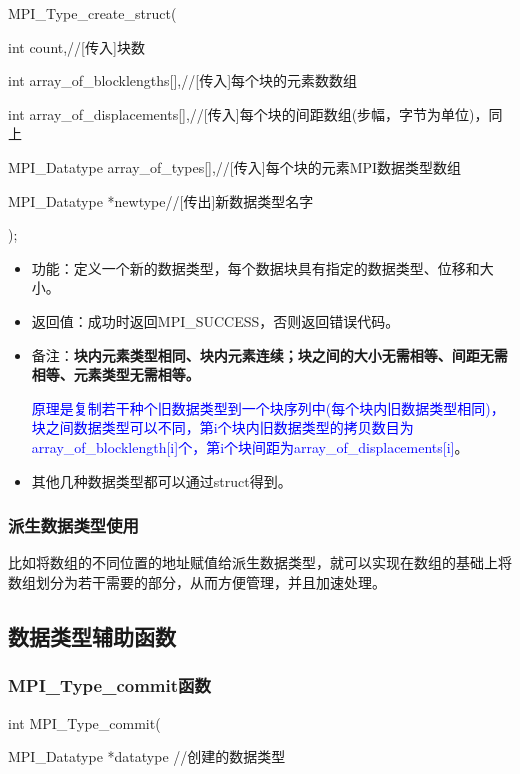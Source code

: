 \documentclass[UTF8]{article}%
\begin{document}
MPI\_Type\_create\_struct(

    \qquad int             count,//[传入]块数

    \qquad int             array\_of\_blocklengths[],//[传入]每个块的元素数数组

    \qquad int             array\_of\_displacements[],//[传入]每个块的间距数组(步幅，字节为单位)，同上

    \qquad MPI\_Datatype   array\_of\_types[],//[传入]每个块的元素MPI数据类型数组

    \qquad MPI\_Datatype   *newtype//[传出]新数据类型名字

);

\begin{itemize}
    \item 功能：定义一个新的数据类型，每个数据块具有指定的数据类型、位移和大小。
    \item 返回值：成功时返回MPI\_SUCCESS，否则返回错误代码。
    \item 备注：\textbf{块内元素类型相同、块内元素连续；块之间的大小无需相等、间距无需相等、元素类型无需相等。}
    
    \textcolor{blue}{原理是复制若干种个旧数据类型到一个块序列中(每个块内旧数据类型相同)，块之间数据类型可以不同，第i个块内旧数据类型的拷贝数目为array\_of\_blocklength[i]个，第i个块间距为array\_of\_displacements[i]}。

    \item 其他几种数据类型都可以通过struct得到。
\end{itemize}

\subsubsection{派生数据类型使用}

比如将数组的不同位置的地址赋值给派生数据类型，就可以实现在数组的基础上将数组划分为若干需要的部分，从而方便管理，并且加速处理。

\subsection{数据类型辅助函数}

\subsubsection{MPI\_Type\_commit函数}

int MPI\_Type\_commit(

    \qquad MPI\_Datatype *datatype //创建的数据类型
\end{document}
